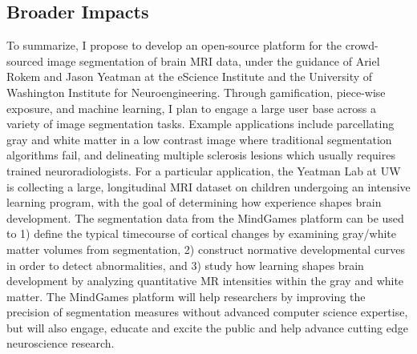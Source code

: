 \subsection*{Broader Impacts}

To summarize, I propose to develop an open-source platform for the crowd-sourced image segmentation of brain MRI data, under the guidance of Ariel Rokem and Jason Yeatman at the eScience Institute and the University of Washington Institute for Neuroengineering. Through gamification, piece-wise exposure, and machine learning, I plan to engage a large user base across a variety of image segmentation tasks. Example applications include parcellating gray and white matter in a low contrast image where traditional segmentation algorithms fail, and delineating multiple sclerosis lesions which usually requires trained neuroradiologists. For a particular application, the Yeatman Lab at UW is collecting a large, longitudinal MRI  dataset on children undergoing an intensive learning program, with the goal of determining how experience shapes brain development. The segmentation data from the MindGames platform can be used to 1) define the typical timecourse of cortical changes by examining gray/white matter volumes from segmentation, 2) construct normative developmental curves in order to detect abnormalities, and 3) study how learning shapes brain development by analyzing quantitative MR intensities within the gray and white matter. The MindGames platform will help researchers by improving the precision of segmentation measures without advanced computer science expertise, but will also engage, educate and excite the public and help advance cutting edge neuroscience research. 
